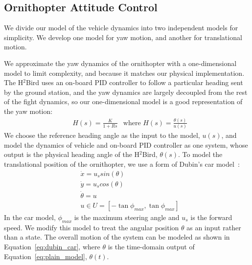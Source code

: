 \documentclass{aamas2013}
\begin{document}
\subsection{Ornithopter Attitude Control}
\label{sec:model_attitude}

We divide our model of the vehicle dynamics into two independent models for 
simplicity. We develop one model for yaw motion, and another for translational motion.

We approximate the yaw dynamics of the ornithopter with a one-dimensional model to 
limit complexity, and because it matches our physical implementation. The H$^2$Bird 
uses an on-board PID controller to follow a particular heading sent by the ground 
station, and the yaw dynamics are largely decoupled from the rest of the fight dynamics, 
so our one-dimensional model is a good representation of the yaw motion:
\begin{equation}
\label{eq:plain_model}
\begin{aligned}
& H(s) = \frac{K}{1 + Rs}
& \text{where }H(s) = \frac{\theta(s)}{u(s)}
\end{aligned}
\end{equation}
We choose the reference heading angle as the input to the model, $u(s)$, and
model the dynamics of vehicle and on-board PID controller as one system, whose
output is the physical heading angle of the H$^2$Bird, $\theta(s)$. To model the translational position of
the ornithopter, we use a form of Dubin's car model~\cite{lavalle:planning}:
\begin{equation}
\label{eq:dubin_car}
\begin{aligned}
& \dot{x} = u_{s}sin(\theta)\\
& \dot{y} = u_{s}cos(\theta)\\
& \dot{\theta} = u\\
& u \in U=[-\tan{\phi_{max}},\tan{\phi_{max}}]
\end{aligned}
\end{equation} 
In the car model, $\phi_{max}$ is the maximum steering angle and $u_{s}$ is
the forward speed. We modify this model to treat the angular position $\theta$
as an input rather than a state. The overall motion of the system can be
modeled as shown in Equation~\ref{eq:dubin_car}, where $\theta$ is the
time-domain output of Equation~\ref{eq:plain_model}, $\theta(t)$.

\end{document}
